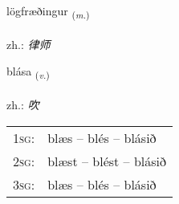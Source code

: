 \documentclass[frontgrid, backgrid]{flacards}\usepackage[]{graphicx}\usepackage[]{xcolor}
\begin{document}
\renewcommand{\flhead}{\vskip5pt \fboxsep=0pt {\small\bfseries\footnotesize Nafnorð | 名词}}
\renewcommand{\fcfoot}{\vskip5pt \fboxsep=0pt \hspace{2pt}{\small\bfseries\footnotesize 3K}}

\renewcommand{\blhead}{\vskip5pt {\small\bfseries\footnotesize Nafnorð | 名词 }}
\renewcommand{\bcfoot}{\vskip5pt \hspace{2pt}{\small\bfseries\footnotesize 3K}}


{lögfræðingur \small{\textsubscript{(\textit{m.})}} \\[1ex] %
\textphonetic{[lœxfraiðiŋkʏr]} \\
zh.: \emph{律师} \\  [2ex]
\renewcommand*{\arraystretch}{0.8}
}

\renewcommand{\flhead}{\vskip5pt \fboxsep=0pt {\small\bfseries\footnotesize Sagnorð | 动词}}
\renewcommand{\fcfoot}{\vskip5pt \fboxsep=0pt \hspace{2pt}{\small\bfseries\footnotesize 3K}}

\renewcommand{\blhead}{\vskip5pt {\small\bfseries\footnotesize Sagnorð | 动词 }}
\renewcommand{\bcfoot}{\vskip5pt \hspace{2pt}{\small\bfseries\footnotesize 3K}}


{blása \small{\textsubscript{(\textit{v.})}} \\[1ex] %
\textphonetic{[plauːsa]} \\
zh.: \emph{吹} \\  [2ex]
\renewcommand*{\arraystretch}{0.8}
\begin{tabular}{p{1cm}l}
\textsc{1sg}: & blæs -- blés -- blásið \\ 
\textsc{2sg}: & blæst -- blést -- blásið \\ 
\textsc{3sg}: & blæs -- blés -- blásið \\ 
\end{tabular}
}
\end{document}

